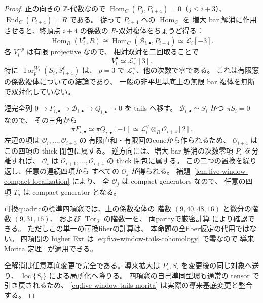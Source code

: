 \begin{proof}
正の向きの $\mathbb Z$-代数なので
$\operatorname{Hom}_C(P_j,P_{i+4})=0$（$j\le i+3$）、
$\operatorname{End}_C(P_{i+4})=R$ である。
従って $P_{i+4}$ への $\operatorname{Hom}_C$ を
増大 bar 解消に作用させると、終頂点 $i+4$ の係数の
$R$-双対複体をちょうど得る：
\[
 \operatorname{Hom}_R(V_i^\bullet,R)
 \cong \operatorname{Hom}_C(\mathcal B_{i,\bullet},P_{i+4})
 \simeq\mathcal L_i[-3].
\]
各 $V_i^{-p}$ は有限 projective なので、
相対双対を二回取ることで
\[
 V_i^\bullet\simeq\mathcal L_i^\vee[3].
 \tag{BW-Tor}\label{eq:five-window-terminal-tor}
\]
特に $\operatorname{Tor}_p^{W_i}(S_i,S_{i+4}^{\ell})$ は、
$p=3$ で $\mathcal L_i^\vee$、他の次数で零である。
これは有限窓の係数複体についての結論であり、
一般の非平坦基底上の無限 bar 複体を無断で双対化していない。

短完全列 $0\to F_{i,\bullet}\to\mathcal B_{i,\bullet}
\to Q_{i,\bullet}\to0$ を tails へ移す。
$\mathcal B_{i,\bullet}\simeq S_i$ かつ $\pi S_i=0$ なので、
その三角から
\[
 \pi F_{i,\bullet}
 \simeq \pi Q_{i,\bullet}[-1]
 \simeq \mathcal L_i^\vee\otimes_R\mathcal O_{i+4}[2].
\]
左辺の項は $\mathcal O_i,\ldots,\mathcal O_{i+3}$ の
有限直和・有限回のconeから作られるため、
$\mathcal O_{i+4}$ はこの四項の thick 閉包に属する。
逆方向には、増大 bar 解消の次数零項 $P_i$ を分離すれば、
$\mathcal O_i$ は
$\mathcal O_{i+1},\ldots,\mathcal O_{i+4}$ の thick 閉包に属する。
この二つの置換を繰り返し、任意の連続四項から
すべての $\mathcal O_j$ が得られる。
補題~\ref{lem:five-window-compact-localization} により、
全 $\mathcal O_j$ は compact generators なので、
任意の四項 $T_a$ は compact generator となる。

可換quadricの標準四項窓では、上の係数複体の
階数 $(9,40,48,16)$ と微分の階数 $(9,31,16)$、
および $\operatorname{Tor}_3$ の階数一を、
両parityで厳密計算
 により確認できる。
ただしこの単一の可換fiberの計算は、
本命題の全fiber仮定の代用ではない。
四項間の higher Ext は \eqref{eq:five-window-tails-cohomology} で零なので
導来 Morita 定理~\cite[\S\S4.3, 8.2]{Keller1994} が適用できる。

全解消は任意基底変更で完全である。導来拡大は $P_i,S_i$ を変更後の同じ対象へ送り、
$\operatorname{loc}\{S_i\}$ による局所化へ降りる。
四項窓の自己準同型環も通常の tensor で引き戻されるため、
\eqref{eq:five-window-tails-morita} は実際の導来基底変更と整合する。
\end{proof}

